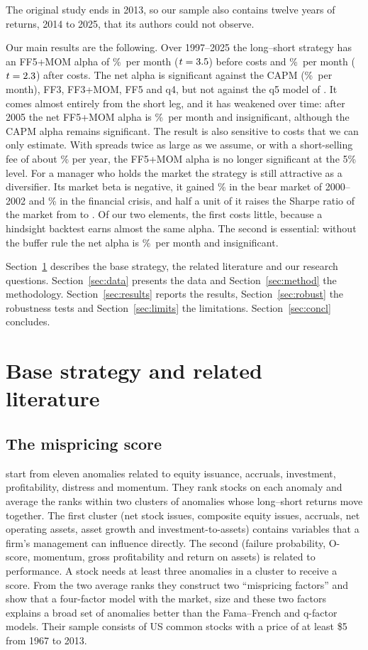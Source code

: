 \documentclass[12pt,a4paper]{article}
\newcommand{\pmo}{\%~per month}
\begin{document}
\noindent The original study ends in 2013, so our sample also contains twelve years of returns, 2014 to 2025, that its authors could not observe.

Our main results are the following. Over 1997--2025 the long--short strategy has an FF5+MOM alpha of \grossfulla\pmo{} ($t=3.5$) before costs and \netfulla\pmo{} ($t=2.3$) after costs. The net alpha is significant against the CAPM (\netfullcapm\pmo), FF3, FF3+MOM, FF5 and q4, but not against the q5 model of \citet{hou2021}. It comes almost entirely from the short leg, and it has weakened over time: after 2005 the net FF5+MOM alpha is \netlatea\pmo{} and insignificant, although the CAPM alpha remains significant. The result is also sensitive to costs that we can only estimate. With spreads twice as large as we assume, or with a short-selling fee of about \feesig\% per year, the FF5+MOM alpha is no longer significant at the 5\% level. For a manager who holds the market the strategy is still attractive as a diversifier. Its market beta is negative, it gained \crdot\% in the bear market of 2000--2002 and \crgfc\% in the financial crisis, and half a unit of it raises the Sharpe ratio of the market from \ovsrzero{} to \ovsrhalf. Of our two elements, the first costs little, because a hindsight backtest earns almost the same alpha. The second is essential: without the buffer rule the net alpha is \basenet\pmo{} and insignificant.

Section~\ref{sec:base} describes the base strategy, the related literature and our research questions. Section~\ref{sec:data} presents the data and Section~\ref{sec:method} the methodology. Section~\ref{sec:results} reports the results, Section~\ref{sec:robust} the robustness tests and Section~\ref{sec:limits} the limitations. Section~\ref{sec:concl} concludes.

\section{Base strategy and related literature}\label{sec:base}

\subsection{The mispricing score}
\citet{stambaugh2017} start from eleven anomalies related to equity issuance, accruals, investment, profitability, distress and momentum. They rank stocks on each anomaly and average the ranks within two clusters of anomalies whose long--short returns move together. The first cluster (net stock issues, composite equity issues, accruals, net operating assets, asset growth and investment-to-assets) contains variables that a firm's management can influence directly. The second (failure probability, O-score, momentum, gross profitability and return on assets) is related to performance. A stock needs at least three anomalies in a cluster to receive a score. From the two average ranks they construct two ``mispricing factors'' and show that a four-factor model with the market, size and these two factors explains a broad set of anomalies better than the Fama--French and q-factor models. Their sample consists of US common stocks with a price of at least \$5 from 1967 to 2013.
\end{document}
